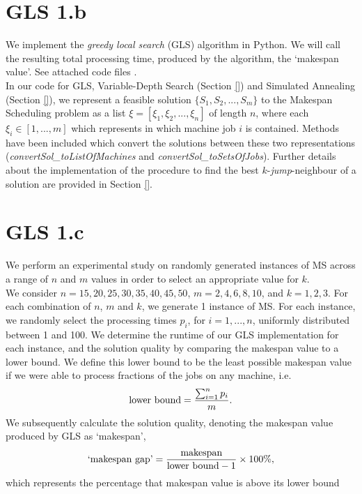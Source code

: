 \documentclass[12pt,a4paper,reqno]{article}
\begin{document}
\section*{GLS 1.b}
We implement the \textit{greedy local search} (GLS) algorithm in Python. We will call the resulting total processing time, produced by the algorithm, the `makespan value'. See attached \color{red} code files \color{black}. \\

In our code for GLS, Variable-Depth Search (Section \ref{}) and Simulated Annealing (Section \ref{}), we represent a feasible solution $\{S_1,S_2,...,S_m\}$ to the Makespan Scheduling problem as a list $\xi = [\xi_1,\xi_2,...,\xi_n]$ of length $n$, where each $\xi_i \in [1,...,m]$ which represents in which machine job $i$ is contained. Methods have been included which convert the solutions between these two representations (\textit{convertSol\_toListOfMachines} and \textit{convertSol\_toSetsOfJobs}). Further details about the implementation of the procedure to find the best $k$-\emph{jump}-neighbour of a solution are provided in Section \ref{}.\\

\section*{GLS 1.c}
We perform an experimental study on randomly generated instances of MS across a range of $n$ and $m$ values in order to select an appropriate value for $k$. \\

We consider $n=15, 20, 25, 30, 35, 40, 45, 50$, $m=2,4,6,8,10$, and $k=1,2,3$. For each combination of $n$, $m$ and $k$, we generate 1 instance of MS. For each instance, we randomly select the processing times $p_i$, for $i=1,...,n$, uniformly distributed between 1 and 100. We determine the runtime of our GLS implementation for each instance, and the solution quality by comparing the makespan value to a lower bound. We define this lower bound to be the least possible makespan value if we were able to process fractions of the jobs on any machine, i.e.
\begin{equation}
\textnormal{lower bound} = \frac{\sum_{i=1}^n p_i}{m}.
\end{equation}
We subsequently calculate the solution quality, denoting the makespan value produced by GLS as `makespan',
\begin{equation}
\textnormal{`makespan gap'} = \frac{\textnormal{makespan}}{\textnormal{lower bound} - 1} \times 100\%,
\end{equation}
which represents the percentage that makespan value is above its lower bound
\end{document}
